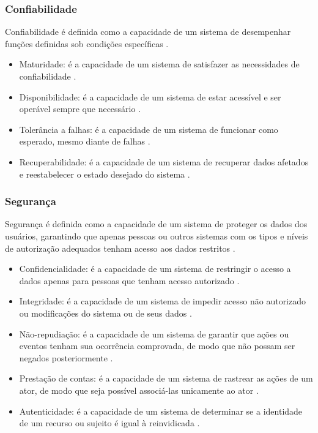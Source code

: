 \subsubsection{Confiabilidade}

Confiabilidade é definida como a capacidade de um sistema de desempenhar funções definidas sob condições específicas .

\begin{itemize}
    \item Maturidade: é a capacidade de um sistema de satisfazer as necessidades de confiabilidade .
    \item Disponibilidade: é a capacidade de um sistema de estar acessível e ser operável sempre que necessário .
    \item Tolerância a falhas: é a capacidade de um sistema de funcionar como esperado, mesmo diante de falhas .
    \item Recuperabilidade: é a capacidade de um sistema de recuperar dados afetados e reestabelecer o estado desejado do sistema .
\end{itemize}

\subsubsection{Segurança}

Segurança é definida como a  capacidade de um sistema de proteger os dados dos usuários, garantindo que apenas pessoas ou outros sistemas com os tipos e níveis de autorização adequados tenham acesso aos dados restritos .

\begin{itemize}
    \item Confidencialidade: é a capacidade de um sistema de restringir o acesso a dados apenas para pessoas que tenham acesso autorizado .
    \item Integridade: é a capacidade de um sistema de impedir acesso não autorizado ou modificações do sistema ou de seus dados .
    \item Não-repudiação: é a capacidade de um sistema de garantir que ações ou eventos tenham sua ocorrência comprovada, de modo que não possam ser negados posteriormente .
    \item Prestação de contas: é a capacidade de um sistema de rastrear as ações de um ator, de modo que seja possível associá-las unicamente ao ator .
    \item Autenticidade: é a capacidade de um sistema de determinar se a identidade de um recurso ou sujeito é igual à reinvidicada .
\end{itemize}

